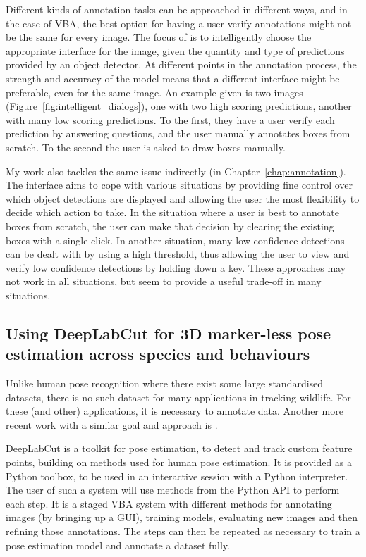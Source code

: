 Different kinds of annotation tasks can be approached in different ways, and in the case of \gls{VBA}, the best option for having a user verify annotations might not be the same for every image. The focus of \cite{Konyushkova2017} is to intelligently choose the appropriate interface for the image, given the quantity and type of predictions provided by an object detector. At different points in the annotation process, the strength and accuracy of the model means that a different interface might be preferable, even for the same image. An example given is two images (Figure~\ref{fig:intelligent_dialogs}), one with two high scoring predictions, another with many low scoring predictions. To the first, they have a user verify each prediction by answering questions, and the user manually annotates boxes from scratch. To the second the user is asked to draw boxes manually. 


My work also tackles the same issue indirectly (in Chapter~\ref{chap:annotation}). The interface aims to cope with various situations by providing fine control over which object detections are displayed and allowing the user the most flexibility to decide which action to take. In the situation where a user is best to annotate boxes from scratch, the user can make that decision by clearing the existing boxes with a single click. In another situation, many low confidence detections can be dealt with by using a high threshold, thus allowing the user to view and verify low confidence detections by holding down a key. These approaches may not work in all situations, but seem to provide a useful trade-off in many situations.

\subsection {Using DeepLabCut for 3D marker-less pose estimation across species and behaviours \texorpdfstring{\cite{Nath2018, Mathis2018}}{}}

Unlike human pose recognition where there exist some large standardised datasets, there is no such dataset for many applications in tracking wildlife. For these (and other) applications, it is necessary to annotate data. Another more recent work with a similar goal and approach is \cite{Graving2019}.

DeepLabCut is a toolkit for pose estimation, to detect and track custom feature points, building on methods used for human pose estimation. It is provided as a Python toolbox, to be used in an interactive session with a Python interpreter. The user of such a system will use methods from the Python \gls{API} to perform each step. It is a staged \gls{VBA} system with different methods for annotating images (by bringing up a GUI), training models, evaluating new images and then refining those annotations. The steps can then be repeated as necessary to train a pose estimation model and annotate a dataset fully. 

